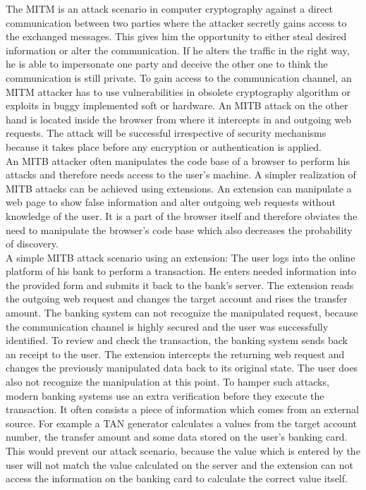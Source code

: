 	The MITM is an attack scenario in computer cryptography against a direct communication between two parties where the attacker secretly gains access to the exchanged messages. This gives him the opportunity to either steal desired information or alter the communication. If he alters the traffic in the right way, he is able to impersonate one party and deceive the other one to think the communication is still private. To gain access to the communication channel, an MITM attacker has to use vulnerabilities in obsolete cryptography algorithm or exploits in buggy implemented soft or hardware. An MITB attack on the other hand is located inside the browser from where it intercepts in and outgoing web requests. The attack will be successful irrespective of security mechanisms because it takes place before any encryption or authentication is applied. \\
	
	An MITB attacker often manipulates the code base of a browser to perform his attacks and therefore needs access to the user's machine. A simpler realization of MITB attacks can be achieved using extensions. An extension can manipulate a web page to show false information and alter outgoing web requests without knowledge of the user. It is a part of the browser itself and therefore obviates the need to manipulate the browser's code base which also decreases the probability of discovery. \\
	
	A simple MITB attack scenario using an extension: The user logs into the online platform of his bank to perform a transaction. He enters needed information into the provided form and submits it back to the bank's server. The extension reads the outgoing web request and changes the target account and rises the transfer amount. The banking system can not recognize the manipulated request, because the communication channel is highly secured and the user was successfully identified. To review and check the transaction, the banking system sends back an receipt to the user. The extension intercepts the returning web request and changes the previously manipulated data back to its original state. The user does also not recognize the manipulation at this point. To hamper such attacks, modern banking systems use an extra verification before they execute the transaction. It often consists a piece of information which comes from an external source. For example a TAN generator calculates a values from the target account number, the transfer amount and some data stored on the user's banking card. This would prevent our attack scenario, because the value which is entered by the user will not match the value calculated on the server and the extension can not access the information on the banking card to calculate the correct value itself. \\
	
